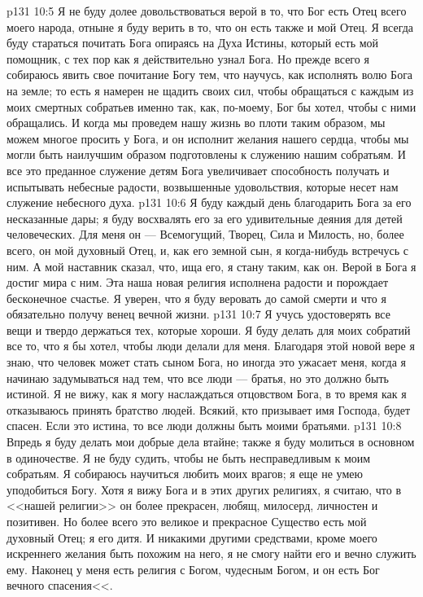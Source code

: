 \vs p131 10:5 Я не буду долее довольствоваться верой в то, что Бог есть Отец всего моего народа, отныне я буду верить в то, что он есть также и мой Отец. Я всегда буду стараться почитать Бога опираясь на Духа Истины, который есть мой помощник, с тех пор как я действительно узнал Бога. Но прежде всего я собираюсь явить свое почитание Богу тем, что научусь, как исполнять волю Бога на земле; то есть я намерен не щадить своих сил, чтобы обращаться с каждым из моих смертных собратьев именно так, как, по\hyp{}моему, Бог бы хотел, чтобы с ними обращались. И когда мы проведем нашу жизнь во плоти таким образом, мы можем многое просить у Бога, и он исполнит желания нашего сердца, чтобы мы могли быть наилучшим образом подготовлены к служению нашим собратьям. И все это преданное служение детям Бога увеличивает способность получать и испытывать небесные радости, возвышенные удовольствия, которые несет нам служение небесного духа.
\vs p131 10:6 Я буду каждый день благодарить Бога за его несказанные дары; я буду восхвалять его за его удивительные деяния для детей человеческих. Для меня он --- Всемогущий, Творец, Сила и Милость, но, более всего, он мой духовный Отец, и, как его земной сын, я когда\hyp{}нибудь встречусь с ним. А мой наставник сказал, что, ища его, я стану таким, как он. Верой в Бога я достиг мира с ним. Эта наша новая религия исполнена радости и порождает бесконечное счастье. Я уверен, что я буду веровать до самой смерти и что я обязательно получу венец вечной жизни.
\vs p131 10:7 Я учусь удостоверять все вещи и твердо держаться тех, которые хороши. Я буду делать для моих собратий все то, что я бы хотел, чтобы люди делали для меня. Благодаря этой новой вере я знаю, что человек может стать сыном Бога, но иногда это ужасает меня, когда я начинаю задумываться над тем, что все люди --- братья, но это должно быть истиной. Я не вижу, как я могу наслаждаться отцовством Бога, в то время как я отказываюсь принять братство людей. Всякий, кто призывает имя Господа, будет спасен. Если это истина, то все люди должны быть моими братьями.
\vs p131 10:8 Впредь я буду делать мои добрые дела втайне; также я буду молиться в основном в одиночестве. Я не буду судить, чтобы не быть несправедливым к моим собратьям. Я собираюсь научиться любить моих врагов; я еще не умею уподобиться Богу. Хотя я вижу Бога и в этих других религиях, я считаю, что в <<нашей религии>> он более прекрасен, любящ, милосерд, личностен и позитивен. Но более всего это великое и прекрасное Существо есть мой духовный Отец; я его дитя. И никакими другими средствами, кроме моего искреннего желания быть похожим на него, я не смогу найти его и вечно служить ему. Наконец у меня есть религия с Богом, чудесным Богом, и он есть Бог вечного спасения<<.
